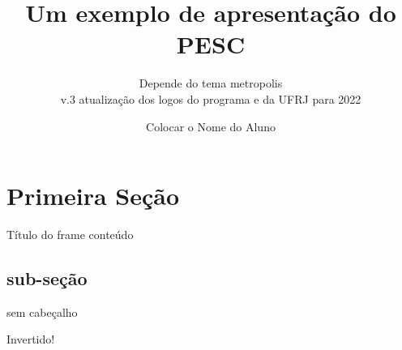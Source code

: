 \documentclass[aspectratio=169]{beamer}
\title[exemplo de apresentação]{Um exemplo de apresentação do PESC}
\subtitle{Depende do tema metropolis \\ v.3 atualização dos logos do programa e da UFRJ para 2022 }
\author{Colocar o Nome do Aluno}
\begin{document}
    \maketitle


\section{Primeira Seção}

\begin{frame}{Título do frame}
	conteúdo
\end{frame}

\subsection{sub-seção}

\begin{frame}[plain]
 sem cabeçalho
\end{frame}

\begin{frame}[standout]
	Invertido!
\end{frame}
\end{document}
